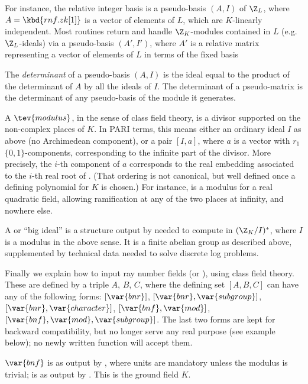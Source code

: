 \item For instance, the relative integer basis  is a pseudo-basis
$(A,I)$ of $\Z_L$, where $A = \kbd{rnf.zk[1]}$ is a vector of elements of $L$,
which are $K$-linearly independent. Most  routines return and handle
$\Z_K$-modules contained in $L$ (e.g.~$\Z_L$-ideals) via a pseudo-basis
$(A',I')$, where $A'$ is a relative matrix representing a vector of elements of
$L$ in terms of the fixed basis 

\item The \emph{determinant} of a pseudo-basis $(A,I)$ is the ideal
equal to the product of the determinant of $A$ by all the ideals of $I$. The
determinant of a pseudo-matrix is the determinant of any pseudo-basis of the
module it generates.

\label{se:CFT}

A $\tev{modulus}$, in the sense of class field theory, is a divisor supported
on the non-complex places of $K$. In PARI terms, this means either an
ordinary ideal $I$ as above (no Archimedean component), or a pair $[I,a]$,
where $a$ is a vector with $r_1$ $\{0,1\}$-components, corresponding to the
infinite part of the divisor. More precisely, the $i$-th component of $a$
corresponds to the real embedding associated to the $i$-th real root of
. (That ordering is not canonical, but well defined once a
defining polynomial for $K$ is chosen.) For instance, \kbd{[1, [1,1]]} is a
modulus for a real quadratic field, allowing ramification at any of the two
places at infinity, and nowhere else.

A  or ``big ideal'' is a structure output by 
needed to compute in $(\Z_K/I)^*$, where $I$ is a modulus in the above sense.
It is a finite abelian group as described above, supplemented by
technical data needed to solve discrete log problems.

Finally we explain how to input ray number fields (or ), using class
field theory. These are defined by a triple $A$, $B$, $C$, where the
defining set $[A,B,C]$ can have any of the following forms:
$[\var{bnr}]$,
$[\var{bnr},\var{subgroup}]$,
$[\var{bnr},\var{character}]$,
$[\var{bnf},\var{mod}]$,
$[\var{bnf},\var{mod},\var{subgroup}]$. The last two forms are kept for
backward compatibility, but no longer serve any real purpose (see example
below); no newly written function will accept them.

\item $\var{bnf}$ is as output by , where units are mandatory
unless the modulus is trivial;  is as output by . This
is the ground field $K$.

